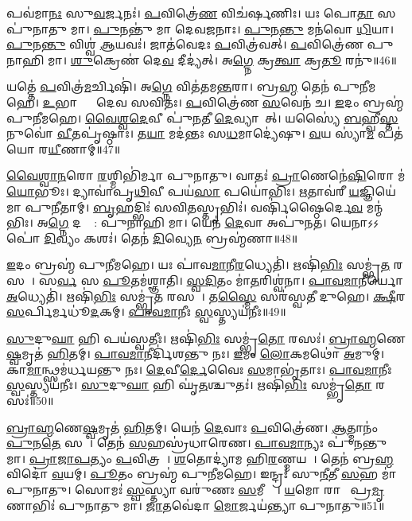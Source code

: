 𑌪𑌵॑𑌮𑌾\ul{𑌨𑌃} 𑌸𑍁\ul{𑌵}𑌰𑍍𑌜𑌨𑌃॑।
\ul{𑌪}𑌵𑌿𑌤𑍍𑌰𑍇॑\ul{𑌣} 𑌵𑌿𑌚॑𑌰𑍍\mbox{}𑌷𑌣𑌿𑌃।
𑌯𑌃 𑌪𑍋\ul{𑌤𑌾} 𑌸 𑌪𑍁॑𑌨𑌾𑌤𑍁 𑌮𑌾।
\ul{𑌪𑍁}𑌨𑌨𑍍𑌤𑍁॑ 𑌮𑌾 𑌦𑍇𑌵\ul{𑌜}𑌨𑌾𑌃।
\ul{𑌪𑍁}𑌨\ul{𑌨𑍍𑌤𑍁} 𑌮𑌨॑𑌵𑍋 \ul{𑌧𑌿}𑌯𑌾।
\ul{𑌪𑍁}𑌨\ul{𑌨𑍍𑌤𑍁} 𑌵𑌿𑌶𑍍𑌵॑ \ul{𑌆}𑌯𑌵𑌃॑।
𑌜𑌾𑌤॑𑌵𑍇𑌦𑌃 \ul{𑌪}𑌵𑌿𑌤𑍍𑌰॑𑌵𑌤𑍍।
\ul{𑌪}𑌵𑌿𑌤𑍍𑌰𑍇॑𑌣 𑌪𑍁𑌨𑌾𑌹𑌿 𑌮𑌾।
\ul{𑌶𑍁}𑌕𑍍𑌰𑍇𑌣॑ 𑌦𑍇\ul{𑌵} 𑌦𑍀𑌦𑍍𑌯॑𑌤𑍍।
𑌅\ul{𑌗𑍍𑌨𑍇} 𑌕𑍍𑌰\ul{𑌤𑍍𑌵𑌾} 𑌕𑍍𑌰\ul{𑌤𑍂}\ul{} 𑌰𑌨𑍁॑॥46॥

𑌯𑌤𑍍𑌤𑍇॑ \ul{𑌪}𑌵𑌿𑌤𑍍𑌰॑\ul{𑌮}𑌰𑍍𑌚𑌿𑌷𑌿॑।
𑌅\ul{𑌗𑍍𑌨𑍇} 𑌵𑌿𑌤॑𑌤𑌮\ul{𑌨𑍍𑌤}𑌰𑌾।
𑌬𑍍𑌰\ul{𑌹𑍍𑌮} 𑌤𑍇𑌨॑ 𑌪𑍁𑌨𑍀𑌮𑌹𑍇।
\ul{𑌉}𑌭𑌾𑌭𑍍𑌯𑌾𑌂᳚ 𑌦𑍇𑌵 𑌸𑌵𑌿𑌤𑌃।
\ul{𑌪}𑌵𑌿𑌤𑍍𑌰𑍇॑𑌣 \ul{𑌸}𑌵𑍇𑌨॑ 𑌚।
\ul{𑌇}𑌦𑌂 𑌬𑍍𑌰𑌹𑍍𑌮॑ 𑌪𑍁𑌨𑍀𑌮𑌹𑍇।
\ul{𑌵𑍈}\ul{𑌶𑍍𑌵}\ul{𑌦𑍇}𑌵𑍀 𑌪𑍁॑\ul{𑌨}𑌤𑍀 \ul{𑌦𑍇}𑌵𑍍𑌯𑌾𑌗𑌾᳚𑌤𑍍।
𑌯𑌸𑍍𑌯𑍈॑ \ul{𑌬}𑌹𑍍𑌵𑍀\ul{𑌸𑍍𑌤}𑌨𑍁𑌵𑍋॑ \ul{𑌵𑍀}𑌤𑌪𑍃॑𑌷𑍍𑌠𑌾𑌃।
𑌤\ul{𑌯𑌾} 𑌮𑌦॑𑌨𑍍𑌤𑌃 𑌸\ul{𑌧}𑌮𑌾𑌦𑍍𑌯𑍇॑𑌷𑍁।
\ul{𑌵}𑌯 𑌸𑍍𑌯𑌾॑\ul{𑌮} 𑌪𑌤॑𑌯𑍋 𑌰\ul{𑌯𑍀}𑌣𑌾𑌮𑍍॥47॥

\ul{𑌵𑍈}\ul{𑌶𑍍𑌵𑌾}\ul{𑌨}𑌰𑍋 \ul{𑌰}𑌶𑍍𑌮𑌿𑌭𑌿॑𑌰𑍍𑌮𑌾 𑌪𑍁𑌨𑌾𑌤𑍁।
𑌵𑌾𑌤𑌃॑ \ul{𑌪𑍍𑌰𑌾}𑌣𑍇𑌨𑍇॑\ul{𑌷𑌿}𑌰𑍋 𑌮॑\ul{𑌯𑍋}𑌭𑍂𑌃।
𑌦𑍍𑌯𑌾𑌵𑌾॑𑌪𑍃\ul{𑌥𑌿}𑌵𑍀 𑌪𑌯॑\ul{𑌸𑌾} 𑌪𑌯𑍋॑𑌭𑌿𑌃।
\ul{𑌋}𑌤𑌾𑌵॑𑌰𑍀 \ul{𑌯}𑌜𑍍𑌞𑌿𑌯𑍇॑ 𑌮𑌾 𑌪𑍁𑌨𑍀𑌤𑌾𑌮𑍍।
\ul{𑌬𑍃}𑌹𑌦𑍍𑌭𑌿𑌃॑ 𑌸𑌵𑌿\ul{𑌤}𑌸𑍍𑌤𑍃𑌭𑌿𑌃॑।
𑌵𑌰𑍍\mbox{}𑌷𑌿॑𑌷𑍍𑌠𑍈𑌰𑍍𑌦𑍇\ul{𑌵} 𑌮𑌨𑍍𑌮॑𑌭𑌿𑌃।
𑌅\ul{𑌗𑍍𑌨𑍇} 𑌦𑌕𑍍𑌷𑍈᳚: 𑌪𑍁𑌨𑌾𑌹𑌿 𑌮𑌾।
𑌯𑍇𑌨॑ \ul{𑌦𑍇}𑌵𑌾 𑌅𑌪𑍁॑𑌨𑌤।
𑌯𑍇𑌨𑌾𑌽𑌽𑌪𑍋॑ \ul{𑌦𑌿}𑌵𑍍𑌯𑌂 𑌕𑌶𑌃॑।
𑌤𑍇𑌨॑ \ul{𑌦𑌿}𑌵𑍍𑌯𑍇\ul{𑌨} 𑌬𑍍𑌰𑌹𑍍𑌮॑𑌣𑌾॥48॥

\ul{𑌇}𑌦𑌂 𑌬𑍍𑌰𑌹𑍍𑌮॑ 𑌪𑍁𑌨𑍀𑌮𑌹𑍇।
𑌯𑌃 𑌪𑌾॑𑌵\ul{𑌮𑌾}𑌨𑍀\ul{𑌰}𑌧𑍍𑌯𑍇𑌤𑌿॑।
𑌋𑌷𑌿॑\ul{𑌭𑌿𑌃} 𑌸𑌮𑍍𑌭𑍃॑\ul{𑌤}\ul{} 𑌰𑌸𑌮𑍍᳚।
𑌸\ul{𑌰𑍍𑌵}\ul{} 𑌸 \ul{𑌪𑍂}𑌤𑌮॑𑌶𑍍𑌞𑌾𑌤𑌿।
\ul{𑌸𑍍𑌵}\ul{𑌦𑌿}𑌤𑌂 𑌮𑌾॑\ul{𑌤}𑌰𑌿𑌶𑍍𑌵॑𑌨𑌾।
\ul{𑌪𑌾}\ul{𑌵}\ul{𑌮𑌾}𑌨𑍀𑌰𑍍𑌯𑍋 \ul{𑌅}𑌧𑍍𑌯𑍇𑌤𑌿॑।
𑌋𑌷𑌿॑\ul{𑌭𑌿𑌃} 𑌸𑌮𑍍𑌭𑍃॑\ul{𑌤}\ul{} 𑌰𑌸𑌮𑍍᳚।
𑌤\ul{𑌸𑍍𑌮𑍈} 𑌸𑌰॑𑌸𑍍𑌵𑌤𑍀 𑌦𑍁𑌹𑍇।
\ul{𑌕𑍍𑌷𑍀}𑌰 \ul{𑌸}𑌰𑍍𑌪𑌿𑌰𑍍𑌮𑌧𑍂॑\ul{𑌦}𑌕𑌮𑍍।
\ul{𑌪𑌾}\ul{𑌵}\ul{𑌮𑌾}𑌨𑍀𑌃 \ul{𑌸𑍍𑌵}𑌸𑍍𑌤𑍍𑌯𑌯॑𑌨𑍀𑌃॥49॥

\ul{𑌸𑍁}𑌦𑍁\ul{𑌘𑌾} 𑌹𑌿 𑌪𑌯॑𑌸𑍍𑌵𑌤𑍀𑌃।
𑌋𑌷𑌿॑\ul{𑌭𑌿𑌃} 𑌸𑌮𑍍𑌭𑍃॑\ul{𑌤𑍋} 𑌰𑌸𑌃॑।
\ul{𑌬𑍍𑌰𑌾}\ul{𑌹𑍍𑌮}𑌣𑍇\ul{𑌷𑍍𑌵}𑌮𑍃𑌤॑ \ul{𑌹𑌿}𑌤𑌮𑍍।
\ul{𑌪𑌾}\ul{𑌵}\ul{𑌮𑌾}𑌨𑍀𑌰𑍍𑌦𑌿॑𑌶𑌨𑍍𑌤𑍁 𑌨𑌃।
\ul{𑌇}𑌮𑌂 \ul{𑌲𑍋}𑌕𑌮𑌥𑍋॑ \ul{𑌅}𑌮𑍁𑌮𑍍।
𑌕𑌾\ul{𑌮𑌾}𑌨𑍍𑌥𑍍𑌸𑌮॑𑌰𑍍𑌧𑌯𑌨𑍍𑌤𑍁 𑌨𑌃।
\ul{𑌦𑍇}𑌵𑍀\ul{𑌰𑍍𑌦𑍇}𑌵𑍈𑌃 \ul{𑌸}𑌮𑌾𑌭𑍃॑𑌤𑌾𑌃।
\ul{𑌪𑌾}\ul{𑌵}\ul{𑌮𑌾}𑌨𑍀𑌃 \ul{𑌸𑍍𑌵}𑌸𑍍𑌤𑍍𑌯𑌯॑𑌨𑍀𑌃।
\ul{𑌸𑍁}𑌦𑍁\ul{𑌘𑌾} 𑌹𑌿 𑌘𑍃॑\ul{𑌤}𑌶𑍍𑌚𑍁𑌤𑌃॑।
𑌋𑌷𑌿॑\ul{𑌭𑌿𑌃} 𑌸𑌮𑍍𑌭𑍃॑\ul{𑌤𑍋} 𑌰𑌸𑌃॑॥50॥

\ul{𑌬𑍍𑌰𑌾}\ul{𑌹𑍍𑌮}𑌣𑍇\ul{𑌷𑍍𑌵}𑌮𑍃𑌤॑ \ul{𑌹𑌿}𑌤𑌮𑍍।
𑌯𑍇𑌨॑ \ul{𑌦𑍇}𑌵𑌾𑌃 \ul{𑌪}𑌵𑌿𑌤𑍍𑌰𑍇॑𑌣।
\ul{𑌆}𑌤𑍍𑌮𑌾𑌨𑌂॑ \ul{𑌪𑍁}𑌨\ul{𑌤𑍇} 𑌸𑌦𑌾᳚।
𑌤𑍇𑌨॑ \ul{𑌸}𑌹𑌸𑍍𑌰॑𑌧𑌾𑌰𑍇𑌣।
\ul{𑌪𑌾}\ul{𑌵}\ul{𑌮𑌾}𑌨𑍍𑌯𑌃 𑌪𑍁॑𑌨𑌨𑍍𑌤𑍁 𑌮𑌾।
\ul{𑌪𑍍𑌰𑌾}\ul{𑌜𑌾}\ul{𑌪}𑌤𑍍𑌯𑌂 \ul{𑌪}𑌵𑌿𑌤𑍍𑌰𑌮𑍍᳚।
\ul{𑌶}𑌤𑍋𑌦𑍍𑌯𑌾॑𑌮 𑌹𑌿\ul{𑌰}𑌣𑍍𑌮𑌯𑌮𑍍᳚।
𑌤𑍇𑌨॑ 𑌬𑍍𑌰\ul{𑌹𑍍𑌮}𑌵𑌿𑌦𑍋॑ \ul{𑌵}𑌯𑌮𑍍।
\ul{𑌪𑍂}𑌤𑌂 𑌬𑍍𑌰𑌹𑍍𑌮॑ 𑌪𑍁𑌨𑍀𑌮𑌹𑍇।
𑌇𑌨𑍍𑌦𑍍𑌰𑌃॑ 𑌸𑍁\ul{𑌨𑍀}𑌤𑍀 \ul{𑌸}𑌹 𑌮𑌾॑ 𑌪𑍁𑌨𑌾𑌤𑍁।
𑌸𑍋𑌮𑌃॑ \ul{𑌸𑍍𑌵}𑌸𑍍𑌤𑍍𑌯𑌾 𑌵𑌰𑍁॑𑌣𑌃 \ul{𑌸}𑌮𑍀𑌚𑍍𑌯𑌾᳚।
\ul{𑌯}𑌮𑍋 𑌰𑌾𑌜𑌾᳚ 𑌪𑍍𑌰\ul{𑌮𑍃}𑌣𑌾𑌭𑌿𑌃॑ 𑌪𑍁𑌨𑌾𑌤𑍁 𑌮𑌾।
\ul{𑌜𑌾}𑌤𑌵𑍇॑𑌦𑌾 \ul{𑌮𑍋}𑌰𑍍𑌜𑌯॑𑌨𑍍𑌤𑍍𑌯𑌾 𑌪𑍁𑌨𑌾𑌤𑍁॥51॥\anuvakamend[𑌅𑌨𑍁॑ 𑌰\ul{𑌯𑍀}𑌣𑌾𑌂 𑌬𑍍𑌰𑌹𑍍𑌮॑𑌣𑌾 \ul{𑌸𑍍𑌵}𑌸𑍍𑌤𑍍𑌯𑌯॑𑌨𑍀𑌃 \ul{𑌸𑍁}𑌦𑍁\ul{𑌘𑌾} 𑌹𑌿 𑌘𑍃॑\ul{𑌤}𑌶𑍍𑌚𑍁\ul{𑌤} 𑌋𑌷𑌿॑\ul{𑌭𑌿𑌃} 𑌸𑌮𑍍𑌭𑍃॑\ul{𑌤𑍋} 𑌰𑌸𑌃॑ 𑌪𑍁𑌨𑌾\ul{𑌤𑍁} 𑌤𑍍𑌰𑍀𑌣𑌿॑ 𑌚]

